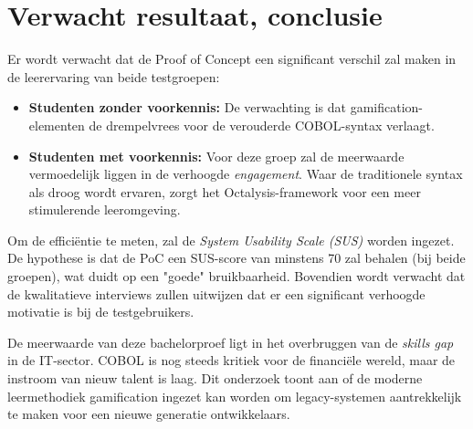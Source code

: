 \section{Verwacht resultaat, conclusie}%
\label{sec:verwachte_resultaten}

Er wordt verwacht dat de Proof of Concept een significant verschil zal maken in de leerervaring van beide testgroepen:
\begin{itemize}
    \item \textbf{Studenten zonder voorkennis:} De verwachting is dat gamification-elementen de drempelvrees voor de verouderde COBOL-syntax verlaagt.
    \item \textbf{Studenten met voorkennis:} Voor deze groep zal de meerwaarde vermoedelijk liggen in de verhoogde \textit{engagement}. 
    Waar de traditionele syntax als droog wordt ervaren, zorgt het Octalysis-framework voor een meer stimulerende leeromgeving.
\end{itemize}

Om de efficiëntie te meten, zal de \textit{System Usability Scale (SUS)} worden ingezet. 
De hypothese is dat de PoC een SUS-score van minstens 70 zal behalen (bij beide groepen), wat duidt op een "goede" bruikbaarheid.
Bovendien wordt verwacht dat de kwalitatieve interviews zullen uitwijzen dat er een significant verhoogde motivatie is bij de testgebruikers.

De meerwaarde van deze bachelorproef ligt in het overbruggen van de \textit{skills gap} in de IT-sector.
COBOL is nog steeds kritiek voor de financiële wereld, maar de instroom van nieuw talent is laag.
Dit onderzoek toont aan of de moderne leermethodiek gamification ingezet kan worden om legacy-systemen aantrekkelijk te maken voor een nieuwe generatie ontwikkelaars.
